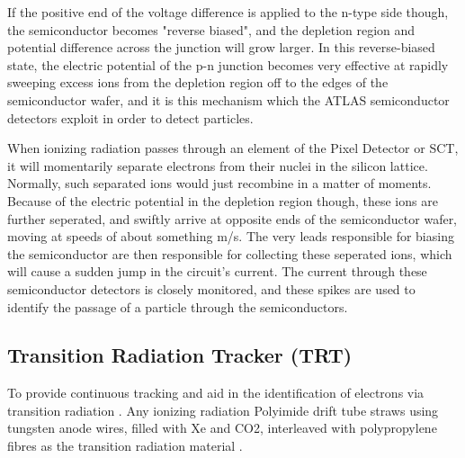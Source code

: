         If the positive end of the voltage difference is applied to the n-type side though, the semiconductor becomes "reverse biased", and the depletion region and potential difference across the junction will grow larger.
        In this reverse-biased state, the electric potential of the p-n junction becomes very effective at rapidly sweeping excess ions from the depletion region off to the edges of the semiconductor wafer, and it is this mechanism which the ATLAS semiconductor detectors exploit in order to detect particles.

        When ionizing radiation passes through an element of the Pixel Detector or SCT, it will momentarily separate electrons from their nuclei in the silicon lattice.
        Normally, such separated ions would just recombine in a matter of moments.
        Because of the electric potential in the depletion region though, these ions are further seperated, and swiftly arrive at opposite ends of the semiconductor wafer, moving at speeds of about something m/s.%
        The very leads responsible for biasing the semiconductor are then responsible for collecting these seperated ions, which will cause a sudden jump in the circuit's current.
        The current through these semiconductor detectors is closely monitored, and these spikes are used to identify the passage of a particle through the semiconductors.




    \subsection{Transition Radiation Tracker (TRT)} %
            To provide continuous tracking and aid in the identification of electrons via transition radiation \cite{ID_DTR}.
            Any ionizing radiation
            Polyimide drift tube straws using tungsten anode wires, filled with Xe and CO2, interleaved with polypropylene fibres as the transition radiation material \cite{atlas_tdr}.

